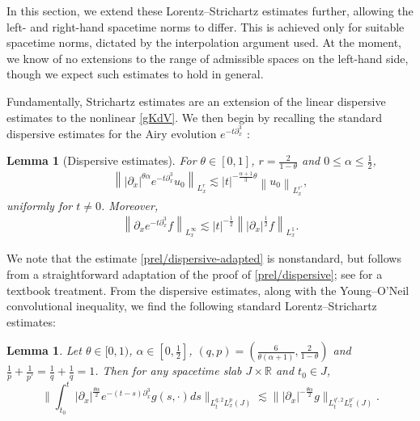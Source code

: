 \documentclass[10pt, reqno]{amsart}
\numberwithin{equation}{section}
\newcommand{\R}{\mathbb{R}}
\newtheorem{lemma}[theorem]{Lemma}
\theoremstyle{definition}
\theoremstyle{remark}
\begin{document}
In this section, we extend these Lorentz--Strichartz estimates further, allowing the left- and right-hand spacetime norms to differ. This is achieved only for suitable spacetime norms, dictated by the interpolation argument used. At the moment, we know of no extensions to the range of admissible spaces on the left-hand side, though we expect such estimates to hold in general.

Fundamentally, Strichartz estimates are an extension of the linear dispersive estimates to the nonlinear \eqref{gKdV}. We then begin by recalling the standard dispersive estimates for the Airy evolution $e^{-t\partial^3_x}$ \cite{KPV89}:
\begin{lemma}[Dispersive estimates]
For $\theta \in [0,1]$, $r = \frac{2}{1-\theta}$ and $0\leq \alpha \leq \frac{1}{2}$,
    \begin{align}
        \left\||\partial_x|^{\theta \alpha}e^{-t\partial^3_x}u_0\right\|_{L^r_x} \lesssim  |t|^{-\frac{\alpha+1}{3}\theta } \left\|u_0\right\|_{L^{r'}_x}, \label{prel/dispersive}
    \end{align}
uniformly for $t \neq 0$. Moreover,
\begin{align}
        \left\|\partial_xe^{-t\partial^3_x}f\right\|_{L^{\infty}_x} \lesssim  |t|^{-\frac{1}{2}} \left\||\partial_x|^{\frac{1}{2}}f\right\|_{L^{1}_x}. \label{prel/dispersive-adapted}
    \end{align}
\end{lemma}
We note that the estimate \eqref{prel/dispersive-adapted} is nonstandard, but follows from a straightforward adaptation of the proof of \eqref{prel/dispersive}; see \cite{erdogan-tzirakis} for a textbook treatment. 
From the dispersive estimates, along with the Young--O'Neil convolutional inequality, we find the following standard Lorentz--Strichartz estimates:
\begin{lemma}\label{prel/strichartz-basic}
    Let $\theta \in [0,1)$, $\alpha \in [0,\frac{1}{2}]$, $(q,p) = (\frac{6}{\theta(\alpha + 1)},\frac{2}{1-\theta})$ and $\frac{1}{p} + \frac{1}{p'} = \frac{1}{q} + \frac{1}{q} = 1$. Then for any spacetime slab $J \times \R$ and $t_0 \in J$,
    \begin{equation*}
        \bigg\|\int_{t_0}^t |\partial_x|^\frac{\theta\alpha}{2} e^{-(t-s)\partial_x^3} g(s,\cdot) ds\bigg\|_{L_t^{q,2}L_x^{p}(J)} \lesssim \big\||\partial_x|^{-\frac{\theta\alpha}{2}}g\big\|_{L_t^{q',2}L_x^{p'}(J)}.
    \end{equation*}
\end{lemma}
\end{document}
